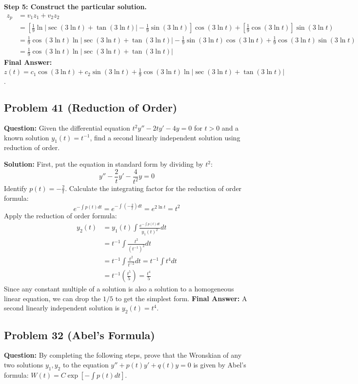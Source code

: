 \documentclass{article}
\begin{document}
\textbf{Step 5: Construct the particular solution.}
\begin{align*}
z_p &= v_1 z_1 + v_2 z_2 \\
&= \left[ \frac{1}{9} \ln|\sec(3 \ln t) + \tan(3 \ln t)| - \frac{1}{9} \sin(3 \ln t) \right] \cos(3 \ln t) + \left[ \frac{1}{9} \cos(3 \ln t) \right] \sin(3 \ln t) \\
&= \frac{1}{9} \cos(3 \ln t) \ln|\sec(3 \ln t) + \tan(3 \ln t)| - \frac{1}{9} \sin(3 \ln t) \cos(3 \ln t) + \frac{1}{9} \cos(3 \ln t) \sin(3 \ln t) \\
&= \frac{1}{9} \cos(3 \ln t) \ln|\sec(3 \ln t) + \tan(3 \ln t)|
\end{align*}
\textbf{Final Answer:} $z(t) = c_1 \cos(3 \ln t) + c_2 \sin(3 \ln t) + \frac{1}{9} \cos(3 \ln t) \ln|\sec(3 \ln t) + \tan(3 \ln t)|$.

\subsection{Problem 41 (Reduction of Order)}
\textbf{Question:} Given the differential equation $t^2 y'' - 2ty' - 4y = 0$ for $t > 0$ and a known solution $y_1(t) = t^{-1}$, find a second linearly independent solution using reduction of order.

\textbf{Solution:}
First, put the equation in standard form by dividing by $t^2$:
\[ y'' - \frac{2}{t}y' - \frac{4}{t^2}y = 0 \]
Identify $p(t) = -\frac{2}{t}$.
Calculate the integrating factor for the reduction of order formula:
\[ e^{-\int p(t) dt} = e^{-\int \left(-\frac{2}{t}\right) dt} = e^{2 \ln t} = t^2 \]
Apply the reduction of order formula:
\begin{align*}
y_2(t) &= y_1(t) \int \frac{e^{-\int p(t) dt}}{y_1(t)^2} dt \\
&= t^{-1} \int \frac{t^2}{(t^{-1})^2} dt \\
&= t^{-1} \int \frac{t^2}{t^{-2}} dt = t^{-1} \int t^4 dt \\
&= t^{-1} \left( \frac{t^5}{5} \right) = \frac{t^4}{5}
\end{align*}
Since any constant multiple of a solution is also a solution to a homogeneous linear equation, we can drop the $1/5$ to get the simplest form.
\textbf{Final Answer:} A second linearly independent solution is $y_2(t) = t^4$.

\subsection{Problem 32 (Abel's Formula)}
\textbf{Question:} By completing the following steps, prove that the Wronskian of any two solutions $y_1, y_2$ to the equation $y'' + p(t)y' + q(t)y = 0$ is given by Abel's formula: $W(t) = C \exp\left[ -\int p(t) dt \right]$.
\end{document}
